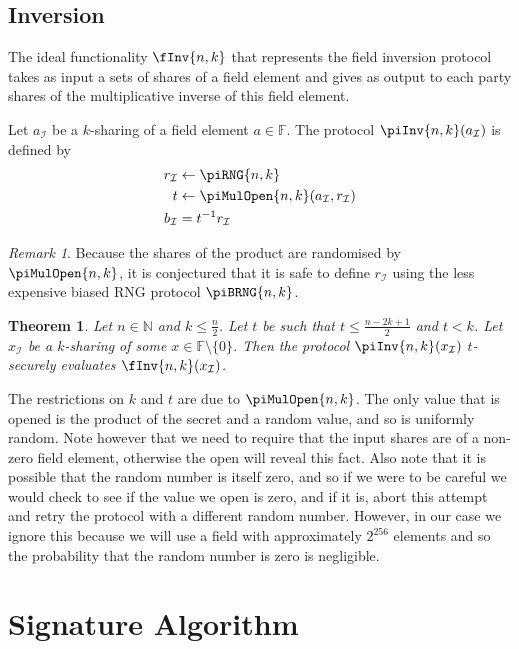 \documentclass{article}
\newtheorem{theorem}{Theorem}
\theoremstyle{remark}
\newtheorem{remark}{Remark}
\newcommand{\N}{\mathbb{N}}
\newcommand{\F}{\mathbb{F}}
\begin{document}
\subsection{Inversion}

The ideal functionality $\fInv{n,k}$ that represents the field inversion
protocol takes as input a sets of shares of a field element and gives as output
to each party shares of the multiplicative inverse of this field element.

Let $a_\mathcal{I}$ be a $k$-sharing of a field element $a \in \F$. The
protocol $\piInv{n,k}(a_\mathcal{I})$ is defined by
\begin{align*}
	r_\mathcal{I} &\leftarrow \piRNG{n,k}\\
	t &\leftarrow \piMulOpen{n,k}(a_\mathcal{I}, r_\mathcal{I})\\
	b_\mathcal{I} &= t^{-1}r_\mathcal{I}
\end{align*}

\begin{remark}
	Because the shares of the product are randomised by $\piMulOpen{n,k}$, it
	is conjectured that it is safe to define $r_\mathcal{I}$ using the less
	expensive biased RNG protocol $\piBRNG{n,k}$.
\end{remark}

\begin{theorem}
	Let $n \in \N$ and $k \le \frac{n}{2}$. Let $t$ be such that $t \le \frac{n
	- 2k + 1}{2}$ and $t < k$. Let $x_\mathcal{I}$ be a $k$-sharing of some $x
	\in \F \setminus \{0\}$. Then the protocol $\piInv{n,k}(x_\mathcal{I})$
	$t$-securely evaluates $\fInv{n,k}(x_\mathcal{I})$.
\end{theorem}

The restrictions on $k$ and $t$ are due to $\piMulOpen{n,k}$. The only value
that is opened is the product of the secret and a random value, and so is
uniformly random. Note however that we need to require that the input shares
are of a non-zero field element, otherwise the open will reveal this fact. Also
note that it is possible that the random number is itself zero, and so if we
were to be careful we would check to see if the value we open is zero, and if
it is, abort this attempt and retry the protocol with a different random
number. However, in our case we ignore this because we will use a field with
approximately $2^{256}$ elements and so the probability that the random number
is zero is negligible.

\section{Signature Algorithm}
\end{document}
